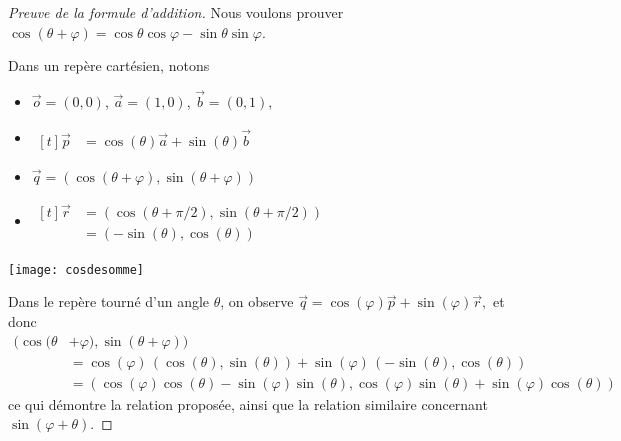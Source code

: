 \begin{frame}%
  \begin{proof}[Preuve de la formule d'addition]
    Nous voulons prouver
    \begin{math}
      \cos (\theta + \varphi) = \cos \theta \cos \varphi - \sin \theta \sin \varphi.
    \end{math}\par\pause
    \begin{minipage}{0.66\linewidth}
      Dans un repère cartésien, notons
      \begin{itemize}
      \item \(\vec{o} = (0,0)\), \(\vec{a} = (1,0)\), \(\vec{b} = (0,1)\),
      \item \(
        \begin{aligned}[t]
          \vec{p} &= %
          \cos(\theta) \vec{a} + \sin(\theta) \vec{b}
        \end{aligned}\)
      \item \(\vec{q} = (\cos(\theta + \varphi),\sin(\theta + \varphi))\)
      \item \(
        \begin{aligned}[t]
          \vec{r} &= (\cos(\theta + \pi/2),\sin(\theta + \pi/2))\\
          &= (-\sin(\theta),\cos(\theta))
        \end{aligned}\)
      \end{itemize}
    \end{minipage}
    \begin{minipage}{0.33\linewidth}
      \texttt{[image: cosdesomme]}
    \end{minipage}\pause

    Dans le repère tourné d'un angle \(\theta\), on observe
    \begin{math}
      \vec{q} = \cos(\varphi) \vec{p} + \sin(\varphi)\vec{r},
    \end{math}
    et donc
    \vspace*{-2.5ex}
    \begin{align*}
      (\cos(\theta& + \varphi),\sin(\theta + \varphi))\\
      &= \cos(\varphi) \, (\cos(\theta),\sin(\theta)) + \sin(\varphi) \, (-\sin(\theta),\cos(\theta))\\
      &= (\cos(\varphi) \cos(\theta) - \sin(\varphi) \sin(\theta), \cos(\varphi) \sin(\theta) + \sin(\varphi)\cos(\theta))
    \end{align*}
    ce qui démontre la relation proposée, ainsi que la relation similaire concernant \(\sin(\varphi+\theta)\).
  \end{proof}
\end{frame}
